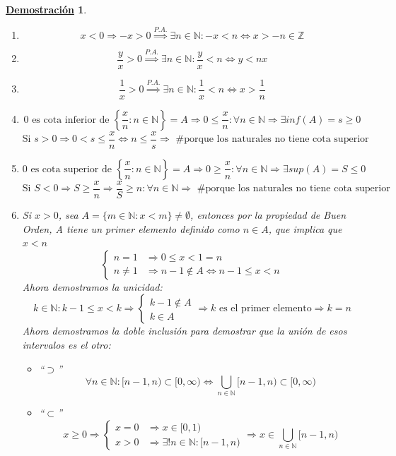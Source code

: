 \documentclass[10pt,a4paper,openright]{book}
\theoremstyle{break}
\newtheorem*{demo}{\underline{Demostración}}
\begin{document}
\begin{demo}
\begin{enumerate}
\item $$x<0\Rightarrow -x>0\stackrel{P.A.}{\Rightarrow} \exists n \in \mathbb N: -x<n\Leftrightarrow x>-n\in \mathbb Z$$
\item $$\frac{y}{x}>0\stackrel{P.A.}{\Rightarrow} \exists n \in \mathbb N : \frac{y}{x}<n \Leftrightarrow y<nx$$
\item $$\frac{1}{x}>0\stackrel{P.A.}{\Rightarrow }\exists n \in \mathbb N : \frac{1}{x}<n\Leftrightarrow x>\frac{1}{n}$$			
\item $$\mbox{0 es cota inferior de } \left\lbrace\frac{x}{n}: n\in \mathbb N\right\rbrace=A\Rightarrow 0\leq \frac{x}{n}: \forall n\in \mathbb N \Rightarrow \exists inf(A)=s\geq 0$$
$$\mbox{Si }s>0\Rightarrow 0<s\leq \frac{x}{n}\Leftrightarrow n\leq \frac{x}{s}\Rightarrow \mbox{ \# porque los naturales no tiene cota superior}$$
\item $$\mbox{0 es cota superior de } \left\lbrace\frac{x}{n}: n\in \mathbb N\right\rbrace=A\Rightarrow 0\geq \frac{x}{n}: \forall n\in \mathbb N\Rightarrow \exists sup(A)=S \leq 0$$
$$\mbox{Si }S<0\Rightarrow S\geq \frac{x}{n}\Rightarrow \frac{x}{S}\geq n: \forall n \in \mathbb N\Rightarrow \mbox{ \# porque los naturales no tiene cota superior}$$
\item Si $x>0$, sea $A=\{m\in \mathbb N: x<m\}\neq \emptyset$, entonces por la propiedad de Buen Orden, A tiene un primer elemento definido como $n\in A$, que implica que $x<n$
$$\begin{cases}n=1 &\Rightarrow 0\leq x<1=n\\
n\neq 1 &\Rightarrow n-1\notin A\Leftrightarrow n-1\leq x< n\end{cases}$$
Ahora demostramos la unicidad:
$$k\in \mathbb N: k-1\leq x<k\Rightarrow \begin{cases}k-1 \notin A \\ k \in A\end{cases}\Rightarrow k \mbox{ es el primer elemento}\Rightarrow k=n$$
Ahora demostramos la doble inclusión para demostrar que la unión de esos intervalos es el otro:
	\begin{itemize}
	\item ``$\supset$''
	$$\forall n \in \mathbb N: [n-1,n)\subset [0,\infty)\Leftrightarrow \bigcup_{n\in \mathbb N}[n-1,n) \subset [0,\infty)$$
	
	\item ``$\subset$''
	$$x\geq 0\Rightarrow \begin{cases} x=0 & \Rightarrow x\in [0,1) \\ x>0 & \Rightarrow \exists! n \in \mathbb N : [n-1,n)	
	\end{cases}\Rightarrow x\in \bigcup_{n\in \mathbb N}[n-1,n) $$
	\end{itemize}


\end{enumerate}
\end{demo}
\end{document}
